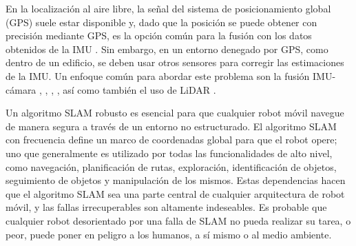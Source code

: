 \ifimagenes
\else
En la localización al aire libre, la señal del sistema de posicionamiento global (GPS) suele estar disponible y, dado que la posición se puede obtener con precisión mediante GPS, es la opción común para la fusión con los datos obtenidos de la IMU \cite{engel2014}. Sin embargo, en un entorno denegado por GPS, como dentro de un edificio, se deben usar otros sensores para corregir las estimaciones de la IMU. Un enfoque común para abordar este problema son la fusión IMU-cámara \cite{mirzaei2008}, \cite{hesch2009}, \cite{chambers2014}, \cite{hesch2013}, así como también el uso de LiDAR \cite{lee2016}.

Un algoritmo SLAM robusto es esencial para que cualquier robot móvil navegue de manera segura a través de un entorno no estructurado. El algoritmo SLAM con frecuencia define un marco de coordenadas global para que el robot opere; uno que generalmente es utilizado por todas las funcionalidades de alto nivel, como navegación, planificación de rutas, exploración, identificación de objetos, seguimiento de objetos y manipulación de los mismos. Estas dependencias hacen que el algoritmo SLAM sea una parte central de cualquier arquitectura de robot móvil, y las fallas irrecuperables son altamente indeseables. Es probable que cualquier robot desorientado por una falla de SLAM no pueda realizar su tarea, o peor, puede poner en peligro a los humanos, a sí mismo o al medio ambiente.


